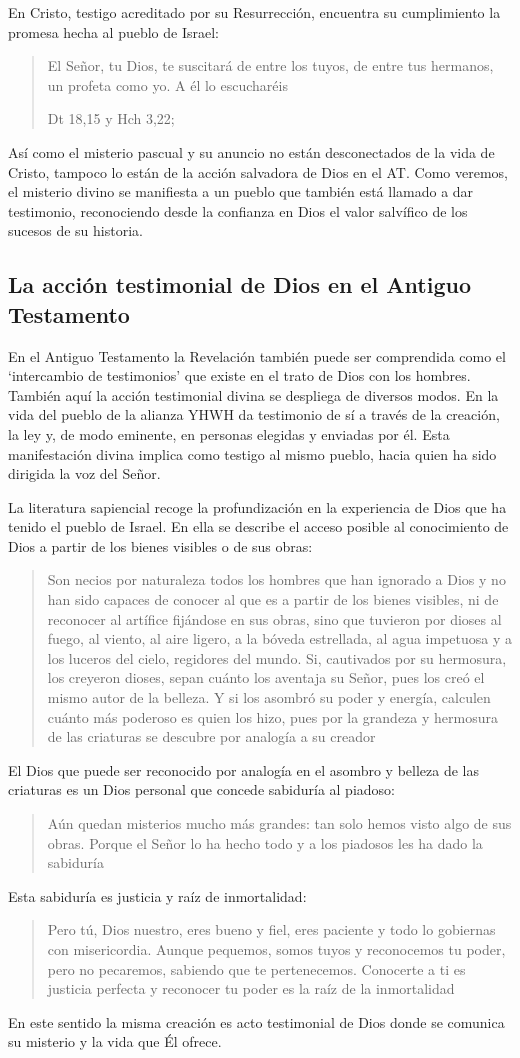 En Cristo, testigo acreditado por su Resurrección, encuentra su cumplimiento la promesa hecha al pueblo de Israel: \blockquote[Dt 18,15 y Hch 3,22; {\cite[Cf.~][24-29]{ratzinger2007jdenaz}}]{El Señor, tu Dios, te suscitará de entre los tuyos, de entre tus hermanos, un profeta como yo. A él lo escucharéis}. Así como el misterio pascual y su anuncio no están desconectados de la vida de Cristo, tampoco lo están de la acción salvadora de Dios en el AT. Como veremos, el misterio divino se manifiesta a un pueblo que también está llamado a dar testimonio, reconociendo desde la confianza en Dios el valor salvífico de los sucesos de su historia.

\subsection{La acción testimonial de Dios en el Antiguo Testamento}

En el Antiguo Testamento la Revelación también puede ser comprendida como el `intercambio de testimonios' que existe en el trato de Dios con los hombres\autocite[Cf.~][1530]{latourelle2000testimonio}. También aquí la acción testimonial divina se despliega de diversos modos. En la vida del pueblo de la alianza YHWH da testimonio de sí a través de la creación, la ley y, de modo eminente, en personas elegidas y enviadas por él\autocite[Cf.~][114s]{prades2015testimonio}. Esta manifestación divina implica como testigo al mismo pueblo, hacia quien ha sido dirigida la voz del Señor.

La literatura sapiencial recoge la profundización en la experiencia de Dios que ha tenido el pueblo de Israel. En ella se describe el acceso posible al conocimiento de Dios a partir de los bienes visibles o de sus obras: \blockquote[][\,(Sab 13,1-5)]{Son necios por naturaleza todos los hombres que han ignorado a Dios y no han sido capaces de conocer al que es a partir de los bienes visibles, ni de reconocer al artífice fijándose en sus obras, sino que tuvieron por dioses al fuego, al viento, al aire ligero, a la bóveda estrellada, al agua impetuosa y a los luceros del cielo, regidores del mundo. Si, cautivados por su hermosura, los creyeron dioses, sepan cuánto los aventaja su Señor, pues los creó el mismo autor de la belleza. Y si los asombró su poder y energía, calculen cuánto más poderoso es quien los hizo, pues por la grandeza y hermosura de las criaturas se descubre por analogía a su creador}.

El Dios que puede ser reconocido por analogía en el asombro y belleza de las criaturas es un Dios personal que concede sabiduría al piadoso: \blockquote[][\,(Eclo 43,32-3)]{Aún quedan misterios mucho más grandes: tan solo hemos visto algo de sus obras. Porque el Señor lo ha hecho todo y a los piadosos les ha dado la sabiduría}. Esta sabiduría es justicia y raíz de inmortalidad: \blockquote[][\,(Sab 15,1-3)]{Pero tú, Dios nuestro, eres bueno y fiel, eres paciente y todo lo gobiernas con misericordia. Aunque pequemos, somos tuyos y reconocemos tu poder, pero no pecaremos, sabiendo que te pertenecemos. Conocerte a ti es justicia perfecta y reconocer tu poder es la raíz de la inmortalidad}. En este sentido la misma creación es acto testimonial de Dios donde se comunica su misterio y la vida que Él ofrece.

